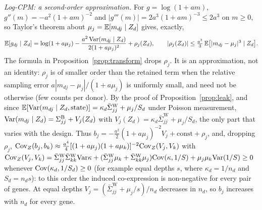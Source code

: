 \emph{Log-CPM: a second-order approximation.} For $g=\log(1+am)$, $g''(m)=-a^2(1+am)^{-2}$ and $|g'''(m)|=2a^3(1+am)^{-3}\le2a^3$ on $m\ge0$, so Taylor's theorem about $\mu_j=\mathbb{E}[m_{dj}\mid Z_d]$ gives, exactly,
\[\mathbb{E}[g_{dj}\mid Z_d]=\log(1+a\mu_j)-\frac{a^2\,\mathrm{Var}(m_{dj}\mid Z_d)}{2(1+a\mu_j)^2}+\rho_j(Z_d),\qquad|\rho_j(Z_d)|\le\tfrac{a^3}{3}\,\mathbb{E}\big[|m_{dj}-\mu_j|^3\mid Z_d\big].\]
The formula in Proposition~\ref{prop:transform} drops $\rho_j$. It is an approximation, not an identity: $\rho_j$ is of smaller order than the retained term when the relative sampling error $a|m_{dj}-\mu_j|/(1+a\mu_j)$ is uniformly small, and need not be otherwise (few counts per donor). By the proof of Proposition~\ref{prop:leak}, and since $\mathbb{E}[\mathrm{Var}(m_{dj}\mid Z_d,\text{state})]=\kappa_d\bar\Sigma^{\mathrm W}_{jj}+\mu_j/S_d$ under Poisson measurement, $\mathrm{Var}(m_{dj}\mid Z_d)=\Sigma^{\mathrm{B}}_{jj}+V_j(Z_d)$ with $V_j(Z_d)=\kappa_d\bar\Sigma^{\mathrm W}_{jj}+\mu_j/S_d$, the only part that varies with the design. Thus $b_j=-\tfrac{a^2}{2}(1+a\mu_j)^{-2}V_j+\text{const}+\rho_j$, and, dropping $\rho_j$, $\mathrm{Cov}_Z(b_j,b_k)\approx\tfrac{a^4}{4}[(1+a\mu_j)(1+a\mu_k)]^{-2}\mathrm{Cov}_Z(V_j,V_k)$ with $\mathrm{Cov}_Z(V_j,V_k)=\bar\Sigma^{\mathrm W}_{jj}\bar\Sigma^{\mathrm W}_{kk}\mathrm{Var}\kappa+(\bar\Sigma^{\mathrm W}_{jj}\mu_k+\bar\Sigma^{\mathrm W}_{kk}\mu_j)\mathrm{Cov}(\kappa,1/S)+\mu_j\mu_k\mathrm{Var}(1/S)\ge0$ whenever $\mathrm{Cov}(\kappa_d,1/S_d)\ge0$ (for example equal depths $s$, where $\kappa_d=1/n_d$ and $S_d=n_ds$): to this order the induced co-expression is non-negative for every pair of genes. At equal depths $V_j=(\bar\Sigma^{\mathrm W}_{jj}+\mu_j/s)/n_d$ decreases in $n_d$, so $b_j$ increases with $n_d$ for every gene.

